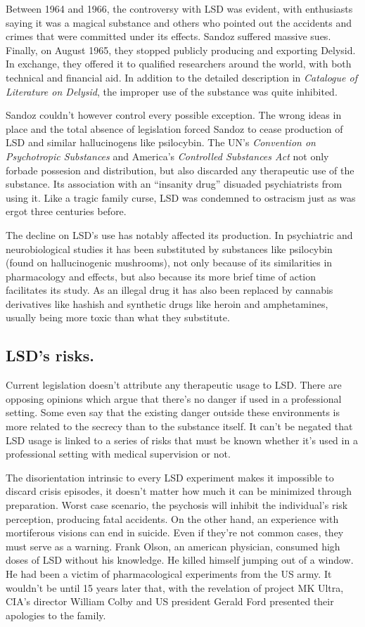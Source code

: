 Between 1964 and 1966, the controversy with LSD was evident, with enthusiasts saying it was a magical substance and others who pointed out the accidents and crimes that were committed under its effects. Sandoz suffered massive sues. Finally, on August 1965, they stopped publicly producing and exporting Delysid. In exchange, they offered it to qualified researchers around the world, with both technical and financial aid. In addition to the detailed description in \textit{Catalogue of Literature on Delysid}, the improper use of the substance was quite inhibited.

Sandoz couldn't however control every possible exception. The wrong ideas in place and the total absence of legislation forced Sandoz to cease production of LSD and similar hallucinogens like psilocybin. The UN's \textit{Convention on Psychotropic Substances} and America's \textit{Controlled Substances Act} not only forbade possesion and distribution, but also discarded any therapeutic use of the substance. Its association with an \enquote{insanity drug} disuaded psychiatrists from using it. Like a tragic family curse, LSD was condemned to ostracism just as was ergot three centuries before.

The decline on LSD's use has notably affected its production. In psychiatric and neurobiological studies it has been substituted by substances like psilocybin (found on hallucinogenic mushrooms), not only because of its similarities in pharmacology and effects, but also because its more brief time of action facilitates its study. As an illegal drug it has also been replaced by cannabis derivatives like hashish and synthetic drugs like heroin and amphetamines, usually being more toxic than what they substitute.

\subsection{LSD's risks.}

Current legislation doesn't attribute any therapeutic usage to LSD. There are opposing opinions which argue that there's no danger if used in a professional setting. Some even say that the existing danger outside these environments is more related to the secrecy than to the substance itself. It can't be negated that LSD usage is linked to a series of risks that must be known whether it's used in a professional setting with medical supervision or not.

The disorientation intrinsic to every LSD experiment makes it impossible to discard crisis episodes, it doesn't matter how much it can be minimized through preparation. Worst case scenario, the psychosis will inhibit the individual's risk perception, producing fatal accidents. On the other hand, an experience with mortiferous visions can end in suicide. Even if they're not common cases, they must serve as a warning. Frank Olson, an american physician, consumed high doses of LSD without his knowledge. He killed himself jumping out of a window. He had been a victim of pharmacological experiments from the US army. It wouldn't be until 15 years later that, with the revelation of project MK Ultra, CIA's director William Colby and US president Gerald Ford presented their apologies to the family.

